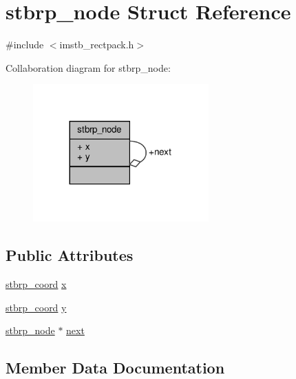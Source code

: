 \hypertarget{structstbrp__node}{}\section{stbrp\+\_\+node Struct Reference}
\label{structstbrp__node}


{\ttfamily \#include $<$imstb\+\_\+rectpack.\+h$>$}



Collaboration diagram for stbrp\+\_\+node\+:
\nopagebreak
\begin{figure}[H]
\begin{center}
\leavevmode
\includegraphics[width=191pt]{structstbrp__node__coll__graph}
\end{center}
\end{figure}
\subsection*{Public Attributes}
\begin{DoxyCompactItemize}
\item 
\hyperlink{imstb__rectpack_8h_a4a396a45893c12de32e2d598abd6b302}{stbrp\+\_\+coord} \hyperlink{structstbrp__node_a45ab31a88025db27d08040d715b129ea}{x}
\item 
\hyperlink{imstb__rectpack_8h_a4a396a45893c12de32e2d598abd6b302}{stbrp\+\_\+coord} \hyperlink{structstbrp__node_ad0415cb102a4f37aa45073653307e67e}{y}
\item 
\hyperlink{structstbrp__node}{stbrp\+\_\+node} $\ast$ \hyperlink{structstbrp__node_a933cb2dd6cddc4fcaf10e3b40634bed4}{next}
\end{DoxyCompactItemize}


\subsection{Member Data Documentation}
\mbox{\label{structstbrp__node_a933cb2dd6cddc4fcaf10e3b40634bed4}} 
